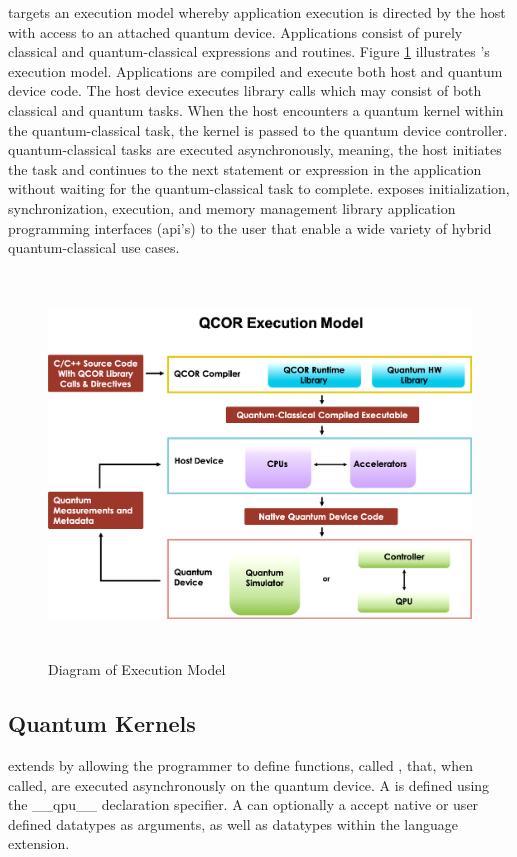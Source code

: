 \qcor targets an execution model whereby application execution is directed by the host with access to an attached quantum device. Applications consist of purely classical and quantum-classical expressions and routines. Figure \ref{fig:exec_model} illustrates \qcor's execution model. Applications are compiled and execute both host and quantum device code. The host device executes \qcor library calls which may consist of both classical and quantum tasks. When the host encounters a quantum kernel within the quantum-classical task, the kernel is passed to the quantum device controller. \qcor quantum-classical tasks are executed asynchronously, meaning, the host initiates the task and continues to the next statement or expression in the application without waiting for the quantum-classical task to complete.
\qcor exposes initialization, synchronization, execution, and memory management library application programming interfaces (api's) to the user that enable a wide variety of hybrid quantum-classical use cases.

\begin{figure}
 \centering
 \includegraphics[width=5in,height=4in]{figures/Execution_Model_Illustration_v3.png}
  \caption{Diagram of \qcor Execution Model}
  \label{fig:exec_model}
\end{figure}


\subsection{\textbf{Quantum Kernels}}\label{subsec:kernel}
\qcor extends \CorCpp by allowing the programmer to define functions, called , that, when called, are executed asynchronously on the quantum device. A  is defined using the \_\_qpu\_\_ declaration specifier. A  can optionally a accept native or user defined \CorCpp datatypes as arguments, as well as datatypes within the \qcor language extension.

